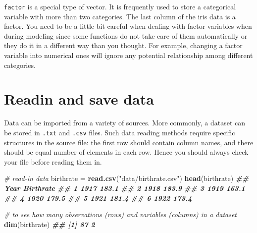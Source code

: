 \documentclass[
]{book}
\newenvironment{Shaded}{\begin{snugshade}}{\end{snugshade}}
\newcommand{\CommentTok}[1]{\textcolor[rgb]{0.56,0.35,0.01}{\textit{#1}}}
\newcommand{\DocumentationTok}[1]{\textcolor[rgb]{0.56,0.35,0.01}{\textbf{\textit{#1}}}}
\newcommand{\FunctionTok}[1]{\textcolor[rgb]{0.13,0.29,0.53}{\textbf{#1}}}
\newcommand{\NormalTok}[1]{#1}
\newcommand{\OtherTok}[1]{\textcolor[rgb]{0.56,0.35,0.01}{#1}}
\newcommand{\SpecialCharTok}[1]{\textcolor[rgb]{0.81,0.36,0.00}{\textbf{#1}}}
\newcommand{\StringTok}[1]{\textcolor[rgb]{0.31,0.60,0.02}{#1}}
\theoremstyle{definition}
\theoremstyle{definition}
\theoremstyle{definition}
\theoremstyle{definition}
\theoremstyle{remark}
\begin{document}
\texttt{factor} is a special type of vector. It is frequently used to store a categorical variable with more than two categories. The last column of the iris data is a factor. You need to be a little bit careful when dealing with factor variables when during modeling since some functions do not take care of them automatically or they do it in a different way than you thought. For example, changing a factor variable into numerical ones will ignore any potential relationship among different categories.

\begin{Shaded}
\end{Shaded}

\hypertarget{readin-and-save-data}{%
\section{Readin and save data}\label{readin-and-save-data}}

Data can be imported from a variety of sources. More commonly, a dataset can be stored in \texttt{.txt} and \texttt{.csv} files. Such data reading methods require specific structures in the source file: the first row should contain column names, and there should be equal number of elements in each row. Hence you should always check your file before reading them in.

\begin{Shaded}
\begin{Highlighting}[]
    \CommentTok{\# read{-}in data}
\NormalTok{    birthrate }\OtherTok{=} \FunctionTok{read.csv}\NormalTok{(}\StringTok{"data/birthrate.csv"}\NormalTok{)}
    \FunctionTok{head}\NormalTok{(birthrate)}
\DocumentationTok{\#\#   Year Birthrate}
\DocumentationTok{\#\# 1 1917     183.1}
\DocumentationTok{\#\# 2 1918     183.9}
\DocumentationTok{\#\# 3 1919     163.1}
\DocumentationTok{\#\# 4 1920     179.5}
\DocumentationTok{\#\# 5 1921     181.4}
\DocumentationTok{\#\# 6 1922     173.4}
    
    \CommentTok{\# to see how many observations (rows) and variables (columns) in a dataset}
    \FunctionTok{dim}\NormalTok{(birthrate)}
\DocumentationTok{\#\# [1] 87  2}
\end{Highlighting}
\end{Shaded}
\end{document}
